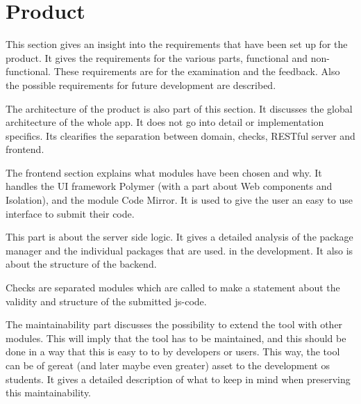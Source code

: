 
\section{Product}
This section gives an insight into the requirements that have been set up for the product.
It gives the requirements for the various parts, functional and non-functional.
These requirements are for the examination and the feedback.
Also the possible requirements for future development are described.

The architecture of the product is also part of this section. 
It discusses the global architecture of the whole app.
It does not go into detail or implementation specifics.
Its clearifies the separation between domain, checks, RESTful server and frontend.



The frontend section explains what modules have been chosen and why.
It handles the UI framework Polymer (with a part about Web components and
Isolation), and the module Code Mirror.
It is used to give
the user an easy to use interface to submit their code.

This part is about the server side logic. It gives a detailed analysis of the
package manager and the individual packages that are used.
in the development. It also is about the structure of the backend.

Checks are separated modules which are called to make a statement
about the validity and structure of the submitted \gls{js-code}.


The maintainability part discusses the possibility to extend the tool with other modules.
This will imply that the tool has to be maintained, and this should be done in a way that this is easy to to by developers or users. This way, the tool can be of gereat (and later maybe even greater) asset to the development os students.
It gives a detailed description of what to keep in mind when preserving this maintainability.


